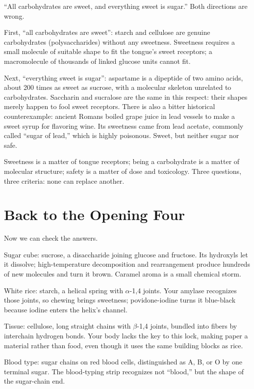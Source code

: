 \begin{wuqu}
``All carbohydrates are sweet, and everything sweet is sugar.'' Both directions are wrong.

First, ``all carbohydrates are sweet'': starch and cellulose are genuine carbohydrates (polysaccharides) without any sweetness. Sweetness requires a small molecule of suitable shape to fit the tongue's sweet receptors; a macromolecule of thousands of linked glucose units cannot fit.

Next, ``everything sweet is sugar'': aspartame is a dipeptide of two amino acids, about 200 times as sweet as sucrose, with a molecular skeleton unrelated to carbohydrates. Saccharin and sucralose are the same in this respect: their shapes merely happen to fool sweet receptors. There is also a bitter historical counterexample: ancient Romans boiled grape juice in lead vessels to make a sweet syrup for flavoring wine. Its sweetness came from lead acetate, commonly called ``sugar of lead,'' which is highly poisonous. Sweet, but neither sugar nor safe.

Sweetness is a matter of tongue receptors; being a carbohydrate is a matter of molecular structure; safety is a matter of dose and toxicology. Three questions, three criteria: none can replace another.
\end{wuqu}

\section{Back to the Opening Four}

Now we can check the answers.

Sugar cube: sucrose, a disaccharide joining glucose and fructose. Its hydroxyls let it dissolve; high-temperature decomposition and rearrangement produce hundreds of new molecules and turn it brown. Caramel aroma is a small chemical storm.

White rice: starch, a helical spring with $\alpha$-1,4 joints. Your amylase recognizes those joints, so chewing brings sweetness; povidone-iodine turns it blue-black because iodine enters the helix's channel.

Tissue: cellulose, long straight chains with $\beta$-1,4 joints, bundled into fibers by interchain hydrogen bonds. Your body lacks the key to this lock, making paper a material rather than food, even though it uses the same building blocks as rice.

Blood type: sugar chains on red blood cells, distinguished as A, B, or O by one terminal sugar. The blood-typing strip recognizes not ``blood,'' but the shape of the sugar-chain end.

